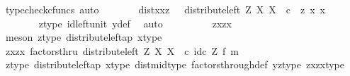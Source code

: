 \begin{isabellebody}
\ {\isacharparenleft}{\kern0pt}typecheck{\isacharunderscore}{\kern0pt}cfuncs{\isacharcomma}{\kern0pt}\ auto{\isacharparenright}{\kern0pt}\isanewline
\ \ \ \ \isamarkupfalse%
\ \isamarkupfalse%
\ distxxz{\isacharcolon}{\kern0pt}\ {\isachardoublequoteopen}{\isachardot}{\kern0pt}{\isachardot}{\kern0pt}{\isachardot}{\kern0pt}\ {\isacharequal}{\kern0pt}\ distribute{\isacharunderscore}{\kern0pt}left\ Z\ X\ X\ \ {\isasymcirc}\isactrlsub c\ \ {\isasymlangle}z{\isacharcomma}{\kern0pt}\ {\isasymlangle}x{\isacharcomma}{\kern0pt}\ x{\isasymrangle}{\isasymrangle}{\isachardoublequoteclose}\isanewline
\ \ \ \ \ \ \isamarkupfalse%
\ z{\isacharunderscore}{\kern0pt}type\ id{\isacharunderscore}{\kern0pt}left{\isacharunderscore}{\kern0pt}unit{}\ y{\isacharunderscore}{\kern0pt}def\ \isamarkupfalse%
\ auto\isanewline
\ \ \ \ \isamarkupfalse%
\ \isamarkupfalse%
\ {\isachardoublequoteopen}{\isachardot}{\kern0pt}{\isachardot}{\kern0pt}{\isachardot}{\kern0pt}\ {\isacharequal}{\kern0pt}\ {\isasymlangle}{\isasymlangle}z{\isacharcomma}{\kern0pt}x{\isasymrangle}{\isacharcomma}{\kern0pt}{\isasymlangle}z{\isacharcomma}{\kern0pt}x{\isasymrangle}{\isasymrangle}{\isachardoublequoteclose}\isanewline
\ \ \ \ \ \ \isamarkupfalse%
\ {\isacharparenleft}{\kern0pt}meson\ z{\isacharunderscore}{\kern0pt}type\ distribute{\isacharunderscore}{\kern0pt}left{\isacharunderscore}{\kern0pt}ap\ x{\isacharunderscore}{\kern0pt}type{\isacharparenright}{\kern0pt}\isanewline
\ \ \ \ \isamarkupfalse%
\ \isamarkupfalse%
\ {\isachardoublequoteopen}{\isasymlangle}{\isasymlangle}z{\isacharcomma}{\kern0pt}x{\isasymrangle}{\isacharcomma}{\kern0pt}{\isasymlangle}z{\isacharcomma}{\kern0pt}x{\isasymrangle}{\isasymrangle}\ factorsthru\ {\isacharparenleft}{\kern0pt}distribute{\isacharunderscore}{\kern0pt}left\ Z\ X\ X\ \ {\isasymcirc}\isactrlsub c\ {\isacharparenleft}{\kern0pt}id\isactrlsub c\ Z\ {\isasymtimes}\isactrlsub f\ m{\isacharparenright}{\kern0pt}{\isacharparenright}{\kern0pt}{\isachardoublequoteclose}\isanewline
\ \ \ \ \ \ \isamarkupfalse%
\ z{\isacharunderscore}{\kern0pt}type\ distribute{\isacharunderscore}{\kern0pt}left{\isacharunderscore}{\kern0pt}ap\ x{\isacharunderscore}{\kern0pt}type\ dist{\isacharunderscore}{\kern0pt}mid{\isacharunderscore}{\kern0pt}type\ factors{\isacharunderscore}{\kern0pt}through{\isacharunderscore}{\kern0pt}def{}\ yz{\isacharunderscore}{\kern0pt}type\ zxzx{\isacharunderscore}{\kern0pt}type\ \isamarkupfalse%

\end{isabellebody}
